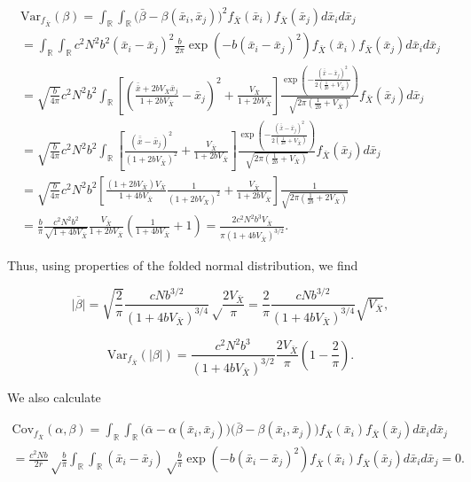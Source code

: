\documentclass[]{article}
\begin{document}
\begin{multline}
\mathrm{Var}_{f_{\bar X}}(\beta)=
\int_\mathbb{R}\int_\mathbb{R}\big(\bar\beta-\beta(\bar x_i,\bar x_j)\big)^2f_{\bar X}(\bar x_i)f_{\bar X}(\bar x_j)d\bar x_id\bar x_j \\
=\int_\mathbb{R}\int_\mathbb{R}c^2N^2b^2(\bar x_i-\bar x_j)^2\frac{b}{2\pi}\exp\left(-b(\bar x_i-\bar x_j)^2\right)f_{\bar X}(\bar x_i)f_{\bar X}(\bar x_j)d\bar x_id\bar x_j \\
=\sqrt{\frac{b}{4\pi}}c^2N^2b^2\int_\mathbb{R}\left[\left(\frac{\bar{\bar x}+2bV_{\bar X}\bar x_j}{1+2bV_{\bar X}}-\bar x_j\right)^2+\frac{V_{\bar X}}{1+2bV_{\bar X}}\right]\frac{\exp\left(-\frac{(\bar{\bar x}-\bar x_j)^2}{2(\frac{1}{2b}+V_{\bar X})}\right)}{\sqrt{2\pi(\frac{1}{2b}+V_{\bar X})}}f_{\bar X}(\bar x_j)d\bar x_j \\
=\sqrt{\frac{b}{4\pi}}c^2N^2b^2\int_\mathbb{R}\left[\frac{(\bar{\bar x}-\bar x_j)^2}{(1+2bV_{\bar X})^2}+\frac{V_{\bar X}}{1+2bV_{\bar X}}\right]\frac{\exp\left(-\frac{(\bar{\bar x}-\bar x_j)^2}{2(\frac{1}{2b}+V_{\bar X})}\right)}{\sqrt{2\pi(\frac{1}{2b}+V_{\bar X})}}f_{\bar X}(\bar x_j)d\bar x_j \\
=\sqrt{\frac{b}{4\pi}}c^2N^2b^2\left[\frac{(1+2bV_{\bar X})V_{\bar X}}{1+4bV_{\bar X}}\frac{1}{(1+2bV_{\bar X})^2}+\frac{V_{\bar X}}{1+2bV_{\bar X}}\right]\frac{1}{\sqrt{2\pi(\frac{1}{2b}+2V_{\bar X})}} \\
=\frac{b}{\pi}\frac{c^2N^2b^2}{\sqrt{1+4bV_{\bar X}}}\frac{V_{\bar X}}{1+2bV_{\bar X}}\left(\frac{1}{1+4bV_{\bar X}}+1\right)=\frac{2c^2N^2b^3V_{\bar X}}{\pi(1+4bV_{\bar X})^{3/2}}.
\end{multline}

Thus, using properties of the folded normal distribution, we find

\begin{equation}
\overline{|\beta|}=\sqrt{\frac{2}{\pi}}\frac{cNb^{3/2}}{(1+4bV_{\bar X})^{3/4}}\sqrt\frac{2V_{\bar X}}{\pi}=\frac{2}{\pi}\frac{cNb^{3/2}}{(1+4bV_{\bar X})^{3/4}}\sqrt{V_{\bar X}},
\end{equation}

\begin{equation}
\mathrm{Var}_{f_{\bar X}}(|\beta|)=\frac{c^2N^2b^3}{(1+4bV_{\bar X})^{3/2}}\frac{2V_{\bar X}}{\pi}\left(1-\frac{2}{\pi}\right).
\end{equation}

We also calculate

\begin{multline}
\mathrm{Cov}_{f_{\bar X}}(\alpha,\beta)=
\int_\mathbb{R}\int_\mathbb{R}\big(\bar\alpha-\alpha(\bar x_i,\bar x_j)\big)\big(\bar\beta-\beta(\bar x_i,\bar x_j)\big)f_{\bar X}(\bar x_i)f_{\bar X}(\bar x_j)d\bar x_id\bar x_j \\
=\frac{c^2Nb}{2\bar r}\sqrt\frac{b}{\pi}\int_\mathbb{R}\int_\mathbb{R}(\bar x_i-\bar x_j)\sqrt\frac{b}{\pi}\exp\left(-b(\bar x_i-\bar x_j)^2\right)f_{\bar X}(\bar x_i)f_{\bar X}(\bar x_j)d\bar x_id\bar x_j=0.
\end{multline}
\end{document}
